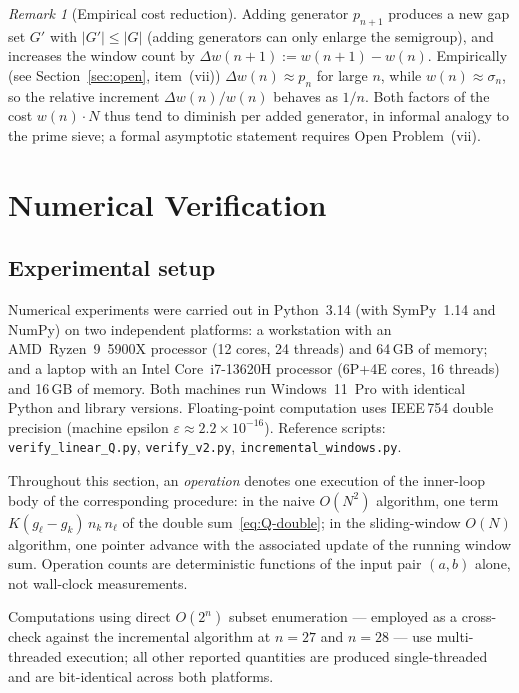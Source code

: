 \documentclass[11pt,a4paper]{amsart}
\theoremstyle{plain}
\theoremstyle{definition}
\theoremstyle{remark}
\newtheorem{remark}[theorem]{Remark}
\begin{document}
\begin{remark}[Empirical cost reduction]
\label{rmk:monotone}
Adding generator $p_{n+1}$ produces a new gap set $G'$ with $|G'| \leq |G|$
(adding generators can only enlarge the semigroup), and increases the
window count by $\Delta w(n+1) := w(n+1) - w(n)$. Empirically (see
Section~\ref{sec:open}, item~(vii)) $\Delta w(n) \approx p_n$ for large $n$,
while $w(n) \approx \sigma_n$, so the relative increment $\Delta w(n)/w(n)$
behaves as $1/n$. Both factors of the cost $w(n) \cdot N$ thus tend to
diminish per added generator, in informal analogy to the prime sieve;
a formal asymptotic statement requires Open Problem~(vii).
\end{remark}

\section{Numerical Verification}
\label{sec:verification}

\subsection{Experimental setup}
\label{sec:experimental}

Numerical experiments were carried out in Python~3.14 (with SymPy~1.14
and NumPy) on two independent platforms: a workstation with an
AMD~Ryzen~9~5900X processor (12 cores, 24 threads) and 64\,GB of memory;
and a laptop with an Intel Core~i7-13620H processor (6P+4E cores, 16 threads)
and 16\,GB of memory. Both machines run Windows~11~Pro with identical
Python and library versions. Floating-point computation uses IEEE\,754
double precision (machine epsilon $\varepsilon \approx 2.2 \times 10^{-16}$).
Reference scripts: \texttt{verify\_linear\_Q.py}, \texttt{verify\_v2.py},
\texttt{incremental\_windows.py}.

Throughout this section, an \emph{operation} denotes one execution of the
inner-loop body of the corresponding procedure: in the naive $O(N^2)$
algorithm, one term $K(g_\ell - g_k)\,n_k\,n_\ell$ of the double
sum~\eqref{eq:Q-double}; in the sliding-window $O(N)$ algorithm, one
pointer advance with the associated update of the running window sum.
Operation counts are deterministic functions of the input pair $(a,b)$
alone, not wall-clock measurements.

Computations using direct $O(2^n)$ subset enumeration --- employed as a
cross-check against the incremental algorithm at $n = 27$ and $n = 28$ ---
use multi-threaded execution; all other reported quantities are produced
single-threaded and are bit-identical across both platforms.
\end{document}
